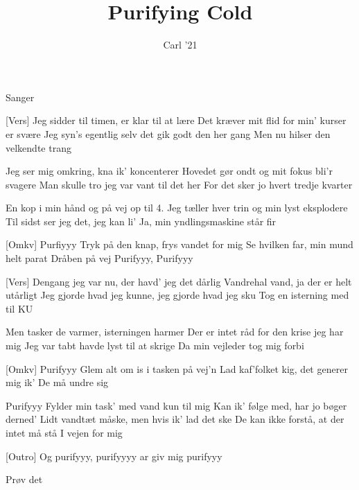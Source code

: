 \documentclass[a4paper,11pt]{article}
\title{Purifying Cold}
\author{Carl '21}
\begin{document}
\maketitle

\begin{roles}
 Sanger
\end{roles}


\begin{song}

[Vers] Jeg sidder til timen, er klar til at lære
    Det kræver mit flid for min' kurser er svære
    Jeg syn's egentlig selv det gik godt den her gang
    Men nu hilser den velkendte trang

    Jeg ser mig omkring, kna ik' koncenterer
    Hovedet gør ondt og mit fokus bli'r svagere
    Man skulle tro jeg var vant til det her
    For det sker jo hvert tredje kvarter

    En kop i min hånd og på vej op til 4.
    Jeg tæller hver trin og min lyst eksplodere
    Til sidst ser jeg det, jeg kan li'
    Ja, min yndlingsmaskine står fir


[Omkv] Purfiyyy
    Tryk på den knap, frys vandet for mig
    Se hvilken far, min mund helt parat
    Dråben på vej
    Purifyyy, Purifyyy


[Vers] Dengang jeg var nu, der havd' jeg det dårlig
    Vandrehal vand, ja der er helt utårligt
    Jeg gjorde hvad jeg kunne, jeg gjorde hvad jeg sku
    Tog en isterning med til KU

    Men tasker de varmer, isterningen harmer
    Der er intet råd for den krise jeg har mig
    Jeg var tabt havde lyst til at skrige
    Da min vejleder tog mig forbi

[Omkv] Purifyyy
    Glem alt om is i tasken på vej'n
    Lad kaf'folket kig, det generer mig ik'
    De må undre sig

    Purifyyy
    Fylder min task' med vand kun til mig
    Kan ik' følge med, har jo bøger derned'
    Lidt vandtæt måske, men hvis ik' lad det ske
    De kan ikke forstå, at der intet må stå
    I vejen for mig

[Outro] Og purifyyy, purifyyyy
    ar giv mig purifyyy

    Prøv det

\end{song}
\end{document}

